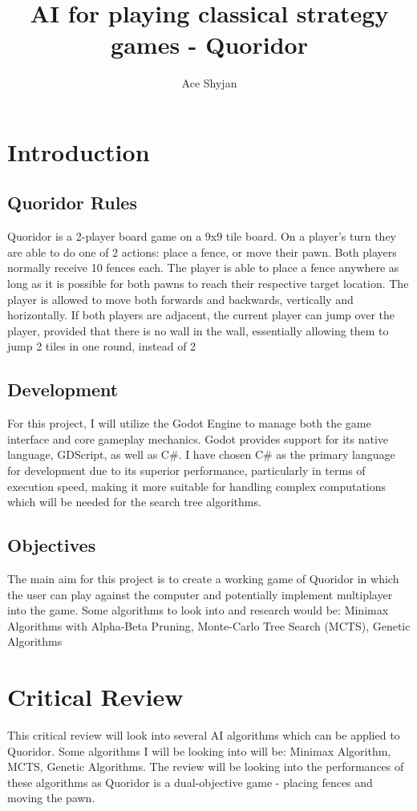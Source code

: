 \documentclass[review]{cmpreport}
\title{AI for playing classical strategy games - Quoridor}
\author{Ace Shyjan}
\begin{document}
\section{Introduction}

\subsection{Quoridor Rules}
Quoridor is a 2-player board game on a 9x9 tile board. On a player's turn they are able to do one of 2 actions: place a fence, or move their pawn. Both players normally receive 10 fences each. The player is able to place a fence anywhere as long as it is possible for both pawns to reach their respective target location. The player is allowed to move both forwards and backwards, vertically and horizontally. If both players are adjacent, the current player can jump over the player, provided that there is no wall in the wall, essentially allowing them to jump 2 tiles in one round, instead of 2

\subsection{Development}
For this project, I will utilize the Godot Engine to manage both the game interface and core gameplay mechanics. Godot provides support for its native language, GDScript, as well as C\#. I have chosen C\# as the primary language for development due to its superior performance, particularly in terms of execution speed, making it more suitable for handling complex computations which will be needed for the search tree algorithms.

\subsection{Objectives}
The main aim for this project is to create a working game of Quoridor in which the user can play against the computer and potentially implement multiplayer into the game.
Some algorithms to look into and research would be: Minimax Algorithms with Alpha-Beta Pruning, Monte-Carlo Tree Search (MCTS), Genetic Algorithms

\section{Critical Review}
This critical review will look into several AI algorithms which can be applied to Quoridor. Some algorithms I will be looking into will be: Minimax Algorithm, MCTS, Genetic Algorithms. The review will be looking into the performances of these algorithms as Quoridor is a dual-objective game - placing fences and moving the pawn.
\end{document}
